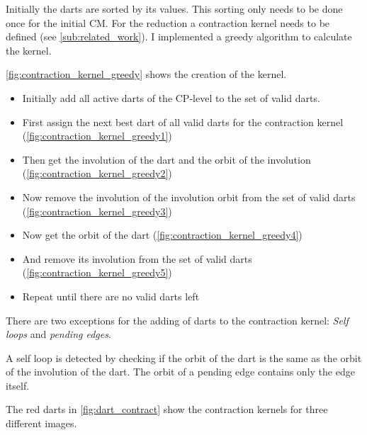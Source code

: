 \documentclass[12pt]{article}
\begin{document}
Initially the darts are sorted by its values. This sorting only needs to be done once for the initial CM\@. For the reduction a contraction kernel needs to be defined (see \cref{sub:related_work}). I implemented a greedy algorithm to calculate the kernel.
\par
\cref{fig:contraction_kernel_greedy} shows the creation of the kernel.
\begin{itemize}
  \item Initially add all active darts of the CP-level to the set of valid darts.
  \item First assign the next best dart of all valid darts for the contraction kernel (\cref{fig:contraction_kernel_greedy1})
  \item Then get the involution of the dart and the orbit of the involution (\cref{fig:contraction_kernel_greedy2})
  \item Now remove the involution of the involution orbit from the set of valid darts (\cref{fig:contraction_kernel_greedy3})
  \item Now get the orbit of the dart (\cref{fig:contraction_kernel_greedy4})
  \item And remove its involution from the set of valid darts (\cref{fig:contraction_kernel_greedy5})
  \item Repeat until there are no valid darts left
\end{itemize}

There are two exceptions for the adding of darts to the contraction kernel:
\emph{Self loops} and \emph{pending edges}.
\par
A self loop is detected by checking if the orbit of the dart is the same as the orbit of the involution of the dart.
The orbit of a pending edge contains only the edge itself.

The red darts in \cref{fig:dart_contract} show the contraction kernels for three different images.
\end{document}
